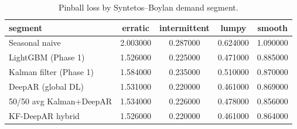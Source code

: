 \begin{table}[t]
\caption{Pinball loss by Syntetos--Boylan demand segment.}
\label{tab:segment}
\begin{tabular}{lcccc}
\toprule
segment & erratic & intermittent & lumpy & smooth \\
\midrule
Seasonal naive & 2.003000 & 0.287000 & 0.624000 & 1.090000 \\
LightGBM (Phase 1) & 1.526000 & 0.225000 & 0.471000 & 0.885000 \\
Kalman filter (Phase 1) & 1.584000 & 0.235000 & 0.510000 & 0.870000 \\
DeepAR (global DL) & 1.531000 & 0.220000 & 0.461000 & 0.869000 \\
50/50 avg Kalman+DeepAR & 1.534000 & 0.226000 & 0.478000 & 0.856000 \\
KF-DeepAR hybrid & 1.526000 & 0.220000 & 0.461000 & 0.864000 \\
\bottomrule
\end{tabular}
\end{table}
